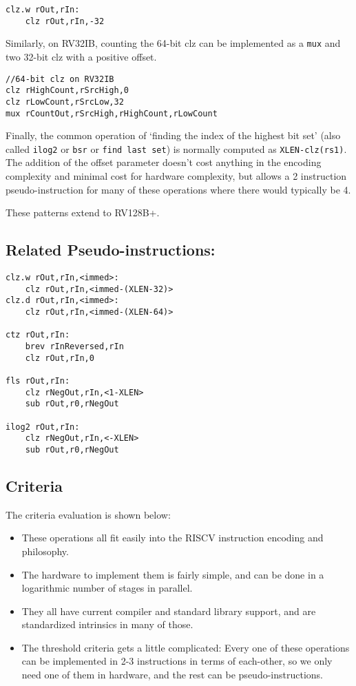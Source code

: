 \begin{verbatim}
clz.w rOut,rIn:
    clz rOut,rIn,-32
\end{verbatim}

Similarly, on RV32IB, counting the 64-bit clz can be implemented as a
\texttt{mux} and two 32-bit clz with a positive offset.

\begin{verbatim}
//64-bit clz on RV32IB
clz rHighCount,rSrcHigh,0
clz rLowCount,rSrcLow,32
mux rCountOut,rSrcHigh,rHighCount,rLowCount
\end{verbatim}

Finally, the common operation of `finding the index of the highest bit
set' (also called \texttt{ilog2} or \texttt{bsr} or
\texttt{find\ last\ set}) is normally computed as
\texttt{XLEN-clz(rs1)}. The addition of the offset parameter doesn't
cost anything in the encoding complexity and minimal cost for hardware
complexity, but allows a 2 instruction pseudo-instruction for many of
these operations where there would typically be 4.

These patterns extend to RV128B+.

\subsection{Related
Pseudo-instructions:}\label{related-pseudo-instructions}

\begin{verbatim}
clz.w rOut,rIn,<immed>:
    clz rOut,rIn,<immed-(XLEN-32)>
clz.d rOut,rIn,<immed>:
    clz rOut,rIn,<immed-(XLEN-64)>

ctz rOut,rIn:
    brev rInReversed,rIn
    clz rOut,rIn,0

fls rOut,rIn:
    clz rNegOut,rIn,<1-XLEN>
    sub rOut,r0,rNegOut

ilog2 rOut,rIn:
    clz rNegOut,rIn,<-XLEN>
    sub rOut,r0,rNegOut
\end{verbatim}

\subsection{Criteria}\label{criteria}

The criteria evaluation is shown below:

\begin{itemize}
\item
  These operations all fit easily into the RISCV instruction encoding
  and philosophy.
\item
  The hardware to implement them is fairly simple, and can be done in a
  logarithmic number of stages in parallel.
\item
  They all have current compiler and standard library support, and are
  standardized intrinsics in many of those.
\item
  The threshold criteria gets a little complicated: Every one of these
  operations can be implemented in 2-3 instructions in terms of
  each-other, so we only need one of them in hardware, and the rest can
  be pseudo-instructions.
\end{itemize}

